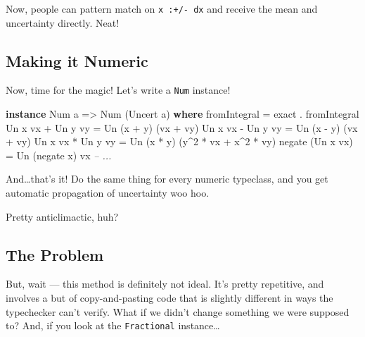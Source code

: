\documentclass[]{article}
\newenvironment{Shaded}{}{}
\newcommand{\KeywordTok}[1]{\textcolor[rgb]{0.00,0.44,0.13}{\textbf{{#1}}}}
\newcommand{\DataTypeTok}[1]{\textcolor[rgb]{0.56,0.13,0.00}{{#1}}}
\newcommand{\DecValTok}[1]{\textcolor[rgb]{0.25,0.63,0.44}{{#1}}}
\newcommand{\CommentTok}[1]{\textcolor[rgb]{0.38,0.63,0.69}{\textit{{#1}}}}
\newcommand{\OtherTok}[1]{\textcolor[rgb]{0.00,0.44,0.13}{{#1}}}
\newcommand{\FunctionTok}[1]{\textcolor[rgb]{0.02,0.16,0.49}{{#1}}}
\newcommand{\NormalTok}[1]{{#1}}
\begin{document}
Now, people can pattern match on \texttt{x\ :+/-\ dx} and receive the
mean and uncertainty directly. Neat!

\subsection{Making it Numeric}\label{making-it-numeric}

Now, time for the magic! Let's write a \texttt{Num} instance!

\begin{Shaded}
\begin{Highlighting}[]
\KeywordTok{instance} \DataTypeTok{Num} \NormalTok{a }\OtherTok{=>} \DataTypeTok{Num} \NormalTok{(}\DataTypeTok{Uncert} \NormalTok{a) }\KeywordTok{where}
    \NormalTok{fromIntegral      }\FunctionTok{=} \NormalTok{exact }\FunctionTok{.} \NormalTok{fromIntegral}
    \DataTypeTok{Un} \NormalTok{x vx }\FunctionTok{+} \DataTypeTok{Un} \NormalTok{y vy }\FunctionTok{=} \DataTypeTok{Un} \NormalTok{(x }\FunctionTok{+} \NormalTok{y)    (vx }\FunctionTok{+} \NormalTok{vy)}
    \DataTypeTok{Un} \NormalTok{x vx }\FunctionTok{-} \DataTypeTok{Un} \NormalTok{y vy }\FunctionTok{=} \DataTypeTok{Un} \NormalTok{(x }\FunctionTok{-} \NormalTok{y)    (vx }\FunctionTok{+} \NormalTok{vy)}
    \DataTypeTok{Un} \NormalTok{x vx }\FunctionTok{*} \DataTypeTok{Un} \NormalTok{y vy }\FunctionTok{=} \DataTypeTok{Un} \NormalTok{(x }\FunctionTok{*} \NormalTok{y)    (y}\FunctionTok{^}\DecValTok{2} \FunctionTok{*} \NormalTok{vx }\FunctionTok{+} \NormalTok{x}\FunctionTok{^}\DecValTok{2} \FunctionTok{*} \NormalTok{vy)}
    \NormalTok{negate (}\DataTypeTok{Un} \NormalTok{x vx)  }\FunctionTok{=} \DataTypeTok{Un} \NormalTok{(negate x) vx}
    \CommentTok{-- ...}
\end{Highlighting}
\end{Shaded}

And\ldots{}that's it! Do the same thing for every numeric typeclass, and
you get automatic propagation of uncertainty woo hoo.

Pretty anticlimactic, huh?

\subsection{The Problem}\label{the-problem}

But, wait --- this method is definitely not ideal. It's pretty
repetitive, and involves a but of copy-and-pasting code that is slightly
different in ways the typechecker can't verify. What if we didn't change
something we were supposed to? And, if you look at the
\texttt{Fractional} instance\ldots{}
\end{document}
